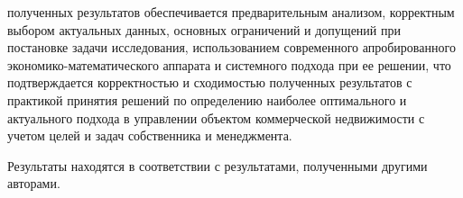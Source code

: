полученных результатов обеспечивается предварительным анализом, корректным выбором актуальных данных, основных ограничений и допущений при постановке задачи исследования, использованием современного апробированного экономико-математического аппарата и системного подхода при ее решении, что подтверждается корректностью и сходимостью полученных результатов с практикой принятия решений по определению наиболее оптимального и актуального подхода в управлении объектом коммерческой недвижимости с учетом целей и задач собственника и менеджмента.

Результаты находятся в соответствии с результатами, полученными другими авторами.